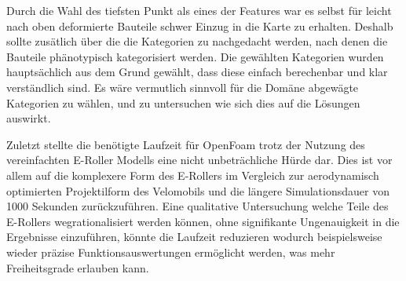 Durch die Wahl des tiefsten Punkt als eines der Features war es selbst für leicht nach oben deformierte Bauteile schwer Einzug in die Karte zu erhalten.
Deshalb sollte zusätlich über die die Kategorien zu nachgedacht werden, nach denen die Bauteile phänotypisch kategorisiert werden.
Die gewählten Kategorien wurden hauptsächlich aus dem Grund gewählt, dass diese einfach berechenbar und klar verständlich sind.
Es wäre vermutlich sinnvoll für die Domäne abgewägte Kategorien zu wählen, und zu untersuchen wie sich dies auf die Lösungen auswirkt.

Zuletzt stellte die benötigte Laufzeit für OpenFoam trotz der Nutzung des vereinfachten E-Roller Modells eine nicht unbeträchliche Hürde dar.
Dies ist vor allem auf die komplexere Form des E-Rollers im Vergleich zur aerodynamisch optimierten Projektilform des Velomobils und die längere Simulationsdauer von 1000 Sekunden zurückzuführen.
Eine qualitative Untersuchung welche Teile des E-Rollers wegrationalisiert werden können, ohne signifikante Ungenauigkeit in die Ergebnisse einzuführen, könnte die Laufzeit reduzieren wodurch beispielsweise wieder präzise Funktionsauswertungen ermöglicht werden, was mehr Freiheitsgrade erlauben kann.